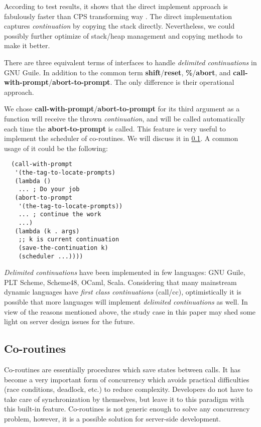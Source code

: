 \documentclass[numbers,numberedpars]{sigplanconf}
\begin{document}
According to test results, it shows that the direct implement approach is fabulously faster than CPS transforming way
\citep{Gasbichler:2002:FSC:581478.581504}. The direct implementation captures {\it continuation} by copying the stack directly.
Nevertheless, we could possibly further optimize of stack/heap management and copying methods to make it better.

There are three equivalent terms of interfaces to handle {\it delimited continuations} in GNU Guile. In addition to the common term
{\bf shift}/{\bf reset},
{\bf \%}/{\bf abort}, and {\bf call-with-prompt}/{\bf abort-to-prompt}. The only difference is their operational approach.

We chose {\bf call-with-prompt}/{\bf abort-to-prompt} for its third argument as a function will receive the thrown {\it continuation}, and will be
called automatically each time the {\bf abort-to-prompt} is called. This feature is very useful to implement the scheduler of co-routines. We will discuss it
in \ref{Co-routines}. A common usage of it could be the following:

\begin{lstlisting}
  (call-with-prompt
   '(the-tag-to-locate-prompts)
   (lambda ()
    ... ; Do your job
   (abort-to-prompt
    '(the-tag-to-locate-prompts))
    ... ; continue the work
    ...)
   (lambda (k . args)
    ;; k is current continuation
    (save-the-continuation k)
    (scheduler ...))))
\end{lstlisting}

{\it Delimited continuations} have been implemented in few languages: GNU Guile, PLT Scheme, Scheme48, OCaml, Scala. Considering that many mainstream dynamic languages have {\it first class continuations} (call/cc), optimistically it is possible that more languages will implement {\it delimited continuations} as well. In view of the reasons mentioned above, the study case in this paper may shed some light on server
design issues for the future.

\subsection{Co-routines} \label{Co-routines}

Co-routines are essentially procedures which save states between calls. It has become a very important form of concurrency which avoids practical difficulties (race conditions, deadlock, etc.) to reduce complexity. Developers do not have to take care of synchronization by themselves, but leave it to this paradigm with this built-in feature. Co-routines is not generic enough to solve any concurrency problem, however,
it is a possible solution for server-side development.
\end{document}
